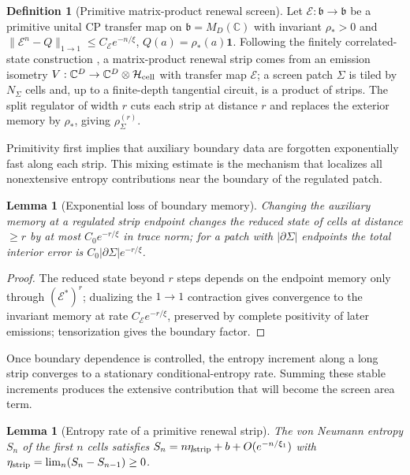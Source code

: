 \documentclass[11pt]{article}
\newtheorem{lemma}[theorem]{Lemma}
\theoremstyle{definition}
\newtheorem{definition}[theorem]{Definition}
\theoremstyle{remark}
\newcommand{\C}{\mathbb C}
\begin{document}
\begin{definition}[Primitive matrix-product renewal screen]
\label{def:primitive-mp-screen}
Let $\mathcal E:\mathfrak b\to\mathfrak b$ be a primitive unital CP transfer map
on $\mathfrak b=M_D(\C)$ with invariant $\rho_*>0$ and
$\|\mathcal E^n-Q\|_{1\to1}\le C_{\mathcal E}e^{-n/\xi}$, $Q(a)=\rho_*(a)\mathbf 1$.
Following the finitely correlated-state construction
\cite{FannesNachtergaeleWerner,KretschmannWerner}, a matrix-product renewal strip
comes from an emission isometry $V:\C^D\to\C^D\otimes\mathcal H_{\rm cell}$ with
transfer map $\mathcal E$; a screen patch $\Sigma$ is tiled by $N_\Sigma$ cells and,
up to a finite-depth tangential circuit, is a product of strips.  The split
regulator of width $r$ cuts each strip at distance $r$ and replaces the exterior
memory by $\rho_*$, giving $\rho^{(r)}_\Sigma$.
\end{definition}

Primitivity first implies that auxiliary boundary data are forgotten
exponentially fast along each strip.  This mixing estimate is the mechanism that
localizes all nonextensive entropy contributions near the boundary of the
regulated patch.

\begin{lemma}[Exponential loss of boundary memory]
\label{lem:boundary-memory-loss}
Changing the auxiliary memory at a regulated strip endpoint changes the reduced
state of cells at distance $\ge r$ by at most $C_0e^{-r/\xi}$ in trace norm; for a
patch with $|\partial\Sigma|$ endpoints the total interior error is
$C_0|\partial\Sigma|e^{-r/\xi}$.
\end{lemma}

\begin{proof}
The reduced state beyond $r$ steps depends on the endpoint memory only through
$(\mathcal E^*)^r$; dualizing the $1\to1$ contraction gives convergence to the
invariant memory at rate $C_{\mathcal E}e^{-r/\xi}$, preserved by complete
positivity of later emissions; tensorization gives the boundary factor.
\end{proof}

Once boundary dependence is controlled, the entropy increment along a long
strip converges to a stationary conditional-entropy rate.  Summing these stable
increments produces the extensive contribution that will become the screen area
term.

\begin{lemma}[Entropy rate of a primitive renewal strip]
\label{lem:strip-entropy-rate}
The von Neumann entropy $S_n$ of the first $n$ cells satisfies
$S_n=n\eta_{\rm strip}+b+O(e^{-n/\xi_1})$ with
$\eta_{\rm strip}=\lim_n(S_n-S_{n-1})\ge0$.
\end{lemma}
\end{document}
